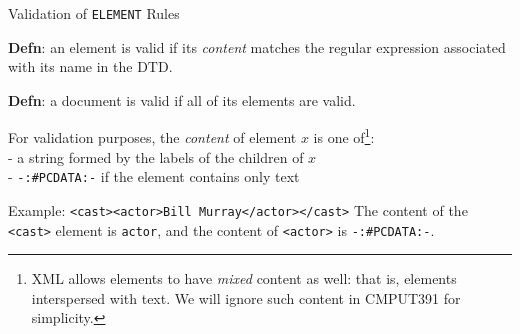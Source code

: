 \begin{frame}[fragile]{Validation of \lstinline{ELEMENT} Rules}

\textbf{Defn}: an element is valid if its \emph{content} matches the regular expression associated with its name in the DTD.

\textbf{Defn}: a document is valid if all of its elements are valid.


For validation purposes, the \emph{content} of element $x$ is one of\footnote{XML allows elements to have \emph{mixed} content as well: that is, elements interspersed with text. We will ignore such content in CMPUT391 for simplicity.}:\\
 - a string formed by the labels of the children of $x$\\
 - \lstinline[language=DTD]{-:#PCDATA:-} if the element contains only text

\begin{block}{Example: \lstinline[style=markup]{<cast><actor>Bill Murray</actor></cast>}}
The content of the \lstinline[style=markup]{<cast>} element is \lstinline[style=markup]{actor}, and the content of \lstinline[style=markup]{<actor>} is \lstinline[language=DTD]{-:#PCDATA:-}.
\end{block}
\end{frame}

